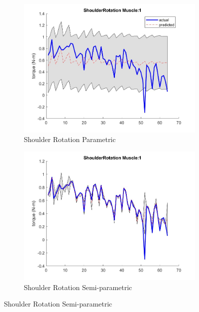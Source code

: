 \begin{figure}[htbp]
    \begin{subfigure}[b]{0.45\linewidth}
        \includegraphics[height=0.15\textheight]{Pictures/Results/GPR/ShoulderRotation_1Parametric.jpg}
        \caption{Shoulder Rotation Parametric}
    \end{subfigure}
    \hfill
    \begin{subfigure}[b]{0.45\linewidth}
        \includegraphics[height=0.15\textheight]{Pictures/Results/GPR/ShoulderRotation_1Semiparametric.jpg}
        \caption{Shoulder Rotation Semi-parametric}
    \end{subfigure}
    

\end{figure}
